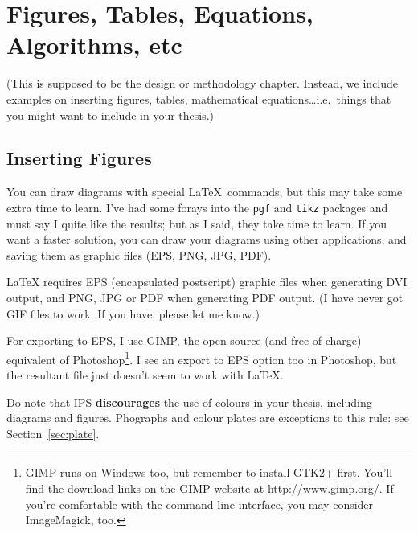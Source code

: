 \chapter{Figures, Tables, Equations, Algorithms, etc}\label{chap:design}


(This is supposed to be the design or methodology chapter.  Instead, we include examples on inserting figures, tables, mathematical equations\ldots i.e.\ things that you might want to include in your thesis.)

\section{Inserting Figures}\label{sec:figure}

You can draw diagrams with special \LaTeX\ commands, but this may take some extra time to learn.  I've had some forays into the \texttt{pgf} and \texttt{tikz} packages and must say I quite like the results; but as I said, they take time to learn. If you want a faster solution, you can draw your diagrams using other applications, and saving them as graphic files (EPS, PNG, JPG, PDF).  

\LaTeX{} requires EPS (encapsulated postscript) graphic files when generating DVI output, and PNG, JPG or PDF when generating PDF output.  (I have never got GIF files to work.  If you have, please let me know.)


For exporting to EPS, I use GIMP, the open-source (and free-of-charge) equivalent of Photoshop\footnote{GIMP runs on Windows too, but remember to install GTK2+ first.  You'll find the download links on the GIMP website at \url{http://www.gimp.org/}.  If you're comfortable with the command line interface, you may consider ImageMagick, too.}.  I see an export to EPS option too in Photoshop, but the resultant file just doesn't seem to work with \LaTeX.

Do note that IPS \textbf{discourages} the use of colours in your thesis, including diagrams and figures.  Phographs and colour plates are exceptions to this rule: see Section~\ref{sec:plate}.

